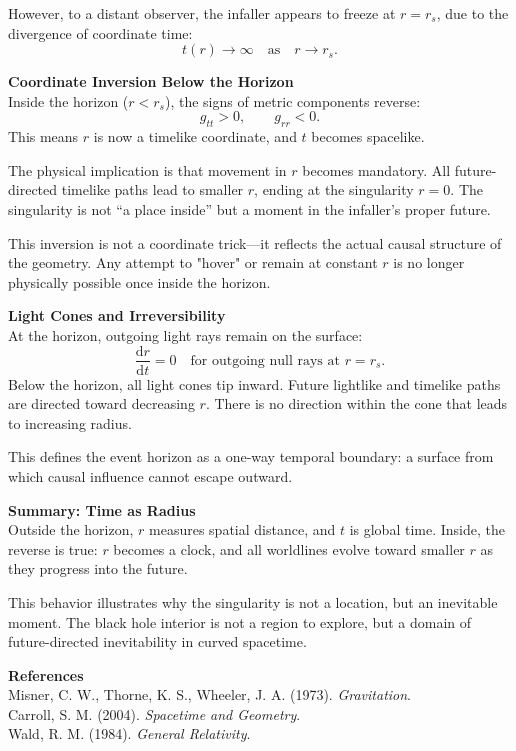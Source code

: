 \begin{technical}
However, to a distant observer, the infaller appears to freeze at \(r = r_s\), due to the divergence of coordinate time:
\[
t(r) \to \infty \quad \text{as} \quad r \to r_s.
\]

\vspace{0.7em}
\noindent\textbf{Coordinate Inversion Below the Horizon}\\[0.5em]
Inside the horizon (\(r < r_s\)), the signs of metric components reverse:
\[
g_{tt} > 0, \qquad g_{rr} < 0.
\]
This means \(r\) is now a timelike coordinate, and \(t\) becomes spacelike.

The physical implication is that movement in \(r\) becomes mandatory. All future-directed timelike paths lead to smaller \(r\), ending at the singularity \(r = 0\). The singularity is not “a place inside” but a moment in the infaller’s proper future.

This inversion is not a coordinate trick—it reflects the actual causal structure of the geometry. Any attempt to "hover" or remain at constant \(r\) is no longer physically possible once inside the horizon.

\vspace{0.7em}
\noindent\textbf{Light Cones and Irreversibility}\\[0.5em]
At the horizon, outgoing light rays remain on the surface:
\[
\frac{\mathrm{d}r}{\mathrm{d}t} = 0 \quad \text{for outgoing null rays at } r = r_s.
\]
Below the horizon, all light cones tip inward. Future lightlike and timelike paths are directed toward decreasing \(r\). There is no direction within the cone that leads to increasing radius.

This defines the event horizon as a one-way temporal boundary: a surface from which causal influence cannot escape outward.

\vspace{0.7em}
\noindent\textbf{Summary: Time as Radius}\\[0.5em]
Outside the horizon, \(r\) measures spatial distance, and \(t\) is global time. Inside, the reverse is true: \(r\) becomes a clock, and all worldlines evolve toward smaller \(r\) as they progress into the future.

This behavior illustrates why the singularity is not a location, but an inevitable moment. The black hole interior is not a region to explore, but a domain of future-directed inevitability in curved spacetime.

\vspace{0.7em}
\noindent\textbf{References}\\
Misner, C. W., Thorne, K. S., Wheeler, J. A. (1973). \textit{Gravitation}.\\
Carroll, S. M. (2004). \textit{Spacetime and Geometry}.\\
Wald, R. M. (1984). \textit{General Relativity}.
\end{technical}
